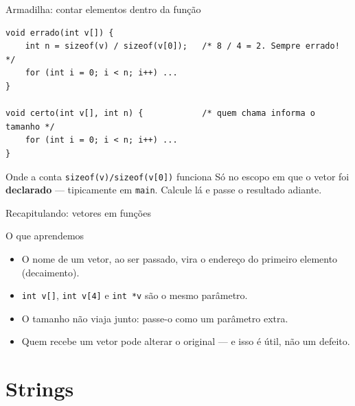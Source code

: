 \documentclass[aspectratio=169]{beamer}
\begin{document}
\begin{frame}[fragile]{Armadilha: contar elementos dentro da função}
\begin{lstlisting}[numbers=none]
void errado(int v[]) {
    int n = sizeof(v) / sizeof(v[0]);   /* 8 / 4 = 2. Sempre errado! */
    for (int i = 0; i < n; i++) ...
}

void certo(int v[], int n) {            /* quem chama informa o tamanho */
    for (int i = 0; i < n; i++) ...
}
\end{lstlisting}
  \begin{block}{Onde a conta \texttt{sizeof(v)/sizeof(v[0])} funciona}
    Só no escopo em que o vetor foi \textbf{declarado} --- tipicamente em
    \texttt{main}. Calcule lá e passe o resultado adiante.
  \end{block}
\end{frame}

\begin{frame}{Recapitulando: vetores em funções}
  \begin{block}{O que aprendemos}
    \begin{itemize}
      \item O nome de um vetor, ao ser passado, vira o endereço do primeiro
            elemento (decaimento).
      \item \texttt{int v[]}, \texttt{int v[4]} e \texttt{int *v} são o mesmo
            parâmetro.
      \item O tamanho não viaja junto: passe-o como um parâmetro extra.
      \item Quem recebe um vetor pode alterar o original --- e isso é útil, não
            um defeito.
    \end{itemize}
  \end{block}
\end{frame}

\section{Strings}
\end{document}
